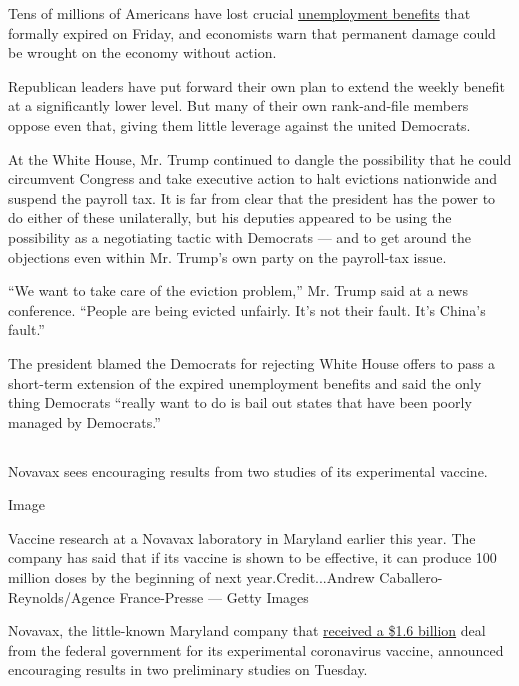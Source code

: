 Tens of millions of Americans have lost crucial
\href{https://slack-redir.net/link?url=https\%3A\%2F\%2Fwww.nytimes.com\%2F2020\%2F07\%2F30\%2Fbusiness\%2Funemployment-payments-change.html}{unemployment
benefits} that formally expired on Friday, and economists warn that
permanent damage could be wrought on the economy without action.

Republican leaders have put forward their own plan to extend the weekly
benefit at a significantly lower level. But many of their own
rank-and-file members oppose even that, giving them little leverage
against the united Democrats.

At the White House, Mr. Trump continued to dangle the possibility that
he could circumvent Congress and take executive action to halt evictions
nationwide and suspend the payroll tax. It is far from clear that the
president has the power to do either of these unilaterally, but his
deputies appeared to be using the possibility as a negotiating tactic
with Democrats --- and to get around the objections even within Mr.
Trump's own party on the payroll-tax issue.

``We want to take care of the eviction problem,'' Mr. Trump said at a
news conference. ``People are being evicted unfairly. It's not their
fault. It's China's fault.''

The president blamed the Democrats for rejecting White House offers to
pass a short-term extension of the expired unemployment benefits and
said the only thing Democrats ``really want to do is bail out states
that have been poorly managed by Democrats.''

\hypertarget{-1}{%
\subsection{}\label{-1}}

Novavax sees encouraging results from two studies of its experimental
vaccine.

Image

Vaccine research at a Novavax laboratory in Maryland earlier this year.
The company has said that if its vaccine is shown to be effective, it
can produce 100 million doses by the beginning of next
year.Credit...Andrew Caballero-Reynolds/Agence France-Presse --- Getty
Images

Novavax, the little-known Maryland company that
\href{https://www.nytimes.com/2020/07/16/health/coronavirus-vaccine-novavax.html}{received
a \$1.6 billion} deal from the federal government for its experimental
coronavirus vaccine, announced encouraging results in two preliminary
studies on Tuesday.


